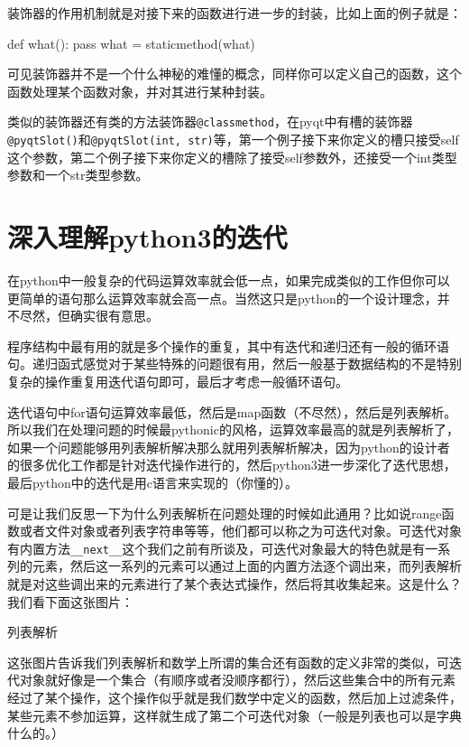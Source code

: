 \documentclass[12pt,oneside]{book}
\begin{document}
\begin{common-format}
装饰器的作用机制就是对接下来的函数进行进一步的封装，比如上面的例子就是：
\begin{tcbpython}[]
    def what():
        pass
    what = staticmethod(what)
\end{tcbpython}

可见装饰器并不是一个什么神秘的难懂的概念，同样你可以定义自己的函数，这个函数处理某个函数对象，并对其进行某种封装。

类似的装饰器还有类的方法装饰器\verb+@classmethod+，在pyqt中有槽的装饰器\verb+@pyqtSlot()+和\verb+@pyqtSlot(int, str)+等，第一个例子接下来你定义的槽只接受self这个参数，第二个例子接下来你定义的槽除了接受self参数外，还接受一个int类型参数和一个str类型参数。




\chapter{深入理解python3的迭代}
\label{sec:深入理解python3的迭代}
在python中一般复杂的代码运算效率就会低一点，如果完成类似的工作但你可以更简单的语句那么运算效率就会高一点。当然这只是python的一个设计理念，并不尽然，但确实很有意思。

程序结构中最有用的就是多个操作的重复，其中有迭代和递归还有一般的循环语句。递归函式感觉对于某些特殊的问题很有用，然后一般基于数据结构的不是特别复杂的操作重复用迭代语句即可，最后才考虑一般循环语句。

迭代语句中for语句运算效率最低，然后是map函数（不尽然），然后是列表解析。所以我们在处理问题的时候最pythonic的风格，运算效率最高的就是列表解析了，如果一个问题能够用列表解析解决那么就用列表解析解决，因为python的设计者的很多优化工作都是针对迭代操作进行的，然后python3进一步深化了迭代思想，最后python中的迭代是用c语言来实现的（你懂的）。

可是让我们反思一下为什么列表解析在问题处理的时候如此通用？比如说range函数或者文件对象或者列表字符串等等，他们都可以称之为可迭代对象。可迭代对象有内置方法\verb+__next__+这个我们之前有所谈及，可迭代对象最大的特色就是有一系列的元素，然后这一系列的元素可以通过上面的内置方法逐个调出来，而列表解析就是对这些调出来的元素进行了某个表达式操作，然后将其收集起来。这是什么？我们看下面这张图片：
\begin{fig}{列表解析}
\caption{列表解析}
\label{fig:列表解析}
\end{fig}

这张图片告诉我们列表解析和数学上所谓的集合还有函数的定义非常的类似，可迭代对象就好像是一个集合（有顺序或者没顺序都行），然后这些集合中的所有元素经过了某个操作，这个操作似乎就是我们数学中定义的函数，然后加上过滤条件，某些元素不参加运算，这样就生成了第二个可迭代对象（一般是列表也可以是字典什么的。）


\end{common-format}
\end{document}
